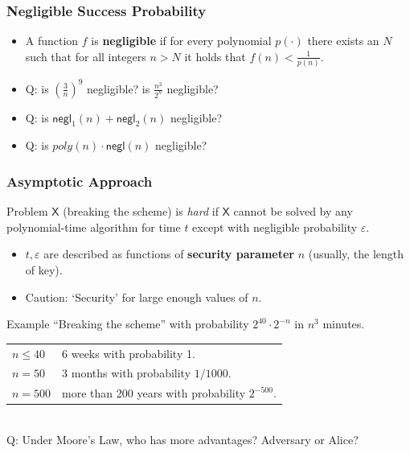 \begin{frame}\frametitle{Negligible Success Probability}
\begin{itemize}
\item A function $f$ is \textbf{negligible} if for every polynomial $p(\cdot)$
there exists an $N$ such that for all integers $n > N$ it holds that $f(n) < \frac{1}{p(n)}$.
\item \alert{Q: is $\left( \frac{3}{n} \right)^{9}$ negligible? is $\frac{n^{2}}{2^{n}}$ negligible?}
\item \alert{Q: is $ \mathsf{negl}_1(n)+\mathsf{negl}_2(n)$ negligible?}
\item \alert{Q: is $ poly(n)\cdot\mathsf{negl}(n)$ negligible?}
\end{itemize}
\end{frame}
\begin{frame}\frametitle{Asymptotic Approach}
Problem $\mathsf{X}$ (breaking the scheme) is \emph{hard} if $\mathsf{X}$ cannot be solved by any polynomial-time algorithm for time $t$ except with negligible probability $\varepsilon$.
\begin{itemize}
\item $t, \varepsilon$ are described as functions of \textbf{security parameter} $n$ (usually, the length of key).%
\item \alert{Caution}: `Security' for large enough values of $n$.
\end{itemize}
\begin{exampleblock}{Example}
``Breaking the scheme'' with probability $2^{40}\cdot 2^{-n}$ in $n^3$ minutes.
\begin{tabular}{ll}
$n \le 40$ & 6 weeks with probability 1. \\
$n=50$   & 3 months with probability $1/1000$. \\
$n=500$  & more than 200 years with probability $2^{-500}$. \\
\end{tabular}\\

\alert{Q: Under Moore's Law, who has more advantages? Adversary or Alice?} 
\end{exampleblock}
\end{frame}

